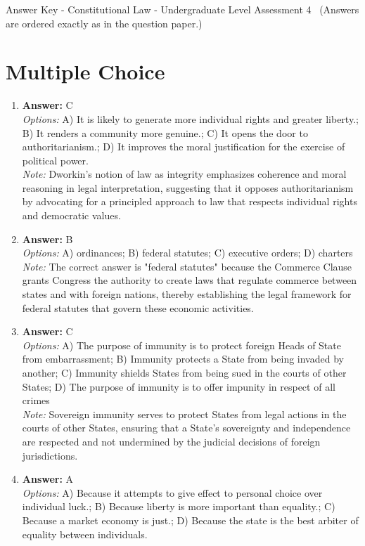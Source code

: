 \documentclass[12pt]{article}
\begin{document}
\begin{center}
Answer Key - Constitutional Law - Undergraduate Level Assessment 4 \
\small (Answers are ordered exactly as in the question paper.)
\end{center}

\section*{Multiple Choice}
\begin{enumerate}[label=\arabic*.]
\item \textbf{Answer:} C
\\ \textit{Options:} A) It is likely to generate more individual rights and greater liberty.; B) It renders a community more genuine.; C) It opens the door to authoritarianism.; D) It improves the moral justification for the exercise of political power.
\\ \textit{Note:} Dworkin's notion of law as integrity emphasizes coherence and moral reasoning in legal interpretation, suggesting that it opposes authoritarianism by advocating for a principled approach to law that respects individual rights and democratic values.
\item \textbf{Answer:} B
\\ \textit{Options:} A) ordinances; B) federal statutes; C) executive orders; D) charters
\\ \textit{Note:} The correct answer is "federal statutes" because the Commerce Clause grants Congress the authority to create laws that regulate commerce between states and with foreign nations, thereby establishing the legal framework for federal statutes that govern these economic activities.
\item \textbf{Answer:} C
\\ \textit{Options:} A) The purpose of immunity is to protect foreign Heads of State from embarrassment; B) Immunity protects a State from being invaded by another; C) Immunity shields States from being sued in the courts of other States; D) The purpose of immunity is to offer impunity in respect of all crimes
\\ \textit{Note:} Sovereign immunity serves to protect States from legal actions in the courts of other States, ensuring that a State's sovereignty and independence are respected and not undermined by the judicial decisions of foreign jurisdictions.
\item \textbf{Answer:} A
\\ \textit{Options:} A) Because it attempts to give effect to personal choice over individual luck.; B) Because liberty is more important than equality.; C) Because a market economy is just.; D) Because the state is the best arbiter of equality between individuals.

\end{enumerate}
\end{document}
